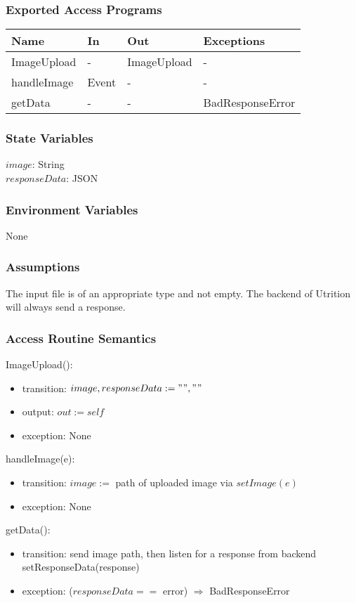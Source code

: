 \documentclass[12pt, titlepage]{article}
\begin{document}
\subsubsection{Exported Access Programs}
\begin{center}
	\begin{tabular}{p{3cm} p{4cm} p{4cm} p{3cm}}
		\hline
		\textbf{Name} & \textbf{In} & \textbf{Out} & \textbf{Exceptions} \\
		\hline
		ImageUpload & - & ImageUpload &- \\
		handleImage & Event & - & - \\
		getData & - & - & BadResponseError \\
		\hline
	\end{tabular}
\end{center}
\subsubsection{State Variables}
$image$: String\\
$responseData$: JSON
\subsubsection{Environment Variables}
None
\subsubsection{Assumptions}
The input file is of an appropriate type and not empty. The backend of Utrition will always send a response.
\subsubsection{Access Routine Semantics}
ImageUpload():
\begin{itemize}
	\item transition: $image, responseData := "", ""$
	\item output: $out := self$
	\item exception: None
\end{itemize}
\noindent
handleImage(e):
\begin{itemize}
	\item transition: $image :=$ path of uploaded image via $setImage(e)$
	\item exception: None
\end{itemize}
\noindent
getData():
\begin{itemize}
	\item transition: send image path, then listen for a response from 
	backend\\ setResponseData(response)
	\item exception: ($responseData ==$ error) $\Rightarrow$ BadResponseError
\end{itemize}
\end{document}
